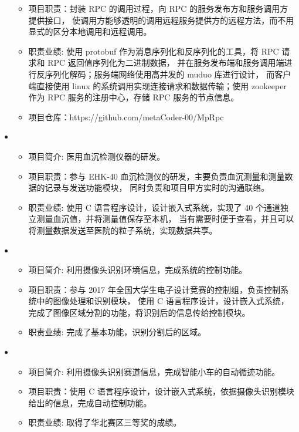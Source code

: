 \begin{itemize}[leftmargin=*]
{\begin{itemize}
      \item 项目职责：封装 RPC 的调用过程，向 RPC 的服务发布方和服务调用方提供接口，
      使调用方能够透明的调用远程服务提供方的远程方法，而不用显式的区分本地调用和远程调用。
      \item 职责业绩: 使用 protobuf 作为消息序列化和反序列化的工具，将 RPC 请求和 RPC 返回值序列化为二进制数据，
      并在服务发布端和服务调用端进行反序列化解码；服务端网络使用高并发的 muduo 库进行设计，
      而客户端直接使用 linux 的系统调用实现连接请求和数据传输；使用 zookeeper 作为 RPC 服务的注册中心，存储 RPC 服务的节点信息。
      \item 项目仓库：https://github.com/metaCoder-00/MpRpc
    \end{itemize}
    }
    \item
    {\small
    \begin{itemize}
      \item 项目简介: 医用血沉检测仪器的研发。
      \item 项目职责：参与 EHK-40 血沉检测仪的研发，主要负责血沉测量和测量数据的记录与发送功能模块，
      同时负责和项目甲方实时的沟通联络。
      \item 职责业绩: 使用 C 语言程序设计，设计嵌入式系统，实现了 40 个通道独立测量血沉值，并将测量值保存至本机，
      当有需要时便于查看，并且可以将测量数据发送至医院的粒子系统，实现数据共享。
    \end{itemize}
    }
    \item
    {\small
    \begin{itemize}
      \item 项目简介: 利用摄像头识别环境信息，完成系统的控制功能。
      \item 项目职责：参与 2017 年全国大学生电子设计竞赛的控制组，负责控制系统中的图像处理和识别模块，
      使用 C 语言程序设计，设计嵌入式系统，完成了图像区域分割的功能，将识别后的信息传给控制模块。
      \item 职责业绩: 完成了基本功能，识别分割后的区域。
    \end{itemize}
    }
    \item
    {\small
    \begin{itemize}
      \item 项目简介: 利用摄像头识别赛道信息，完成智能小车的自动循迹功能。
      \item 项目职责：使用 C 语言程序设计，设计嵌入式系统，依据摄像头识别模块给出的信息，完成自动控制功能。
      \item 职责业绩: 取得了华北赛区三等奖的成绩。
    \end{itemize}
    }
  \end{itemize}